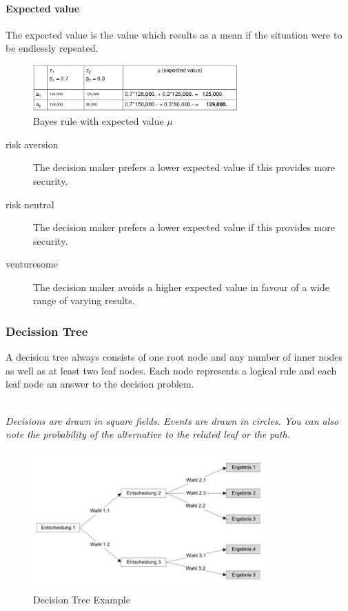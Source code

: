 \paragraph{Expected value} The expected value is the value which results
as a mean if the situation were to be endlessly repeated.

\begin{figure}[H]
\centering
\includegraphics[width=0.7\textwidth]{figures/bayesRule.png}
\caption{Bayes rule with expected value $\mu$}
\end{figure}

\begin{description}
	\item[risk aversion] The decision maker prefers a lower expected
	value if this provides more security.
	\item[risk neutral] The decision maker prefers a lower expected
	value if this provides more security.
	\item[venturesome] The decision maker avoids a higher expected value
	in favour of a wide range of varying results.
\end{description}

\subsubsection{Decission Tree}

A decision tree always consists of one root node and any number of inner
nodes as well as at least two leaf nodes. Each node represents a logical
rule and each leaf node an answer to the decision problem.

\mbox{}\\
\emph{Decisions are drawn in square fields. Events are drawn in circles. You can also note the probability of the alternative to the related leaf or the path.}

\begin{figure}[H]
	\centering
	\includegraphics[width=0.8\textwidth]{figures/DecisionTreeExample.png}
	\caption{Decision Tree Example}
\end{figure}

